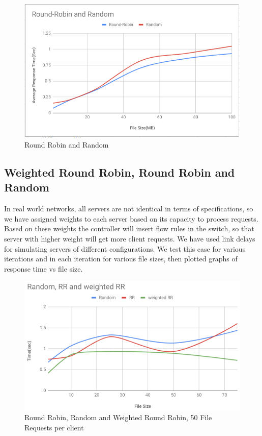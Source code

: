\documentclass[letterpaper, 10 pt, conference]{IEEEtran}
\begin{document}
\begin{figure}[ht!]
\centering
\includegraphics[width=\linewidth]{0.png}
\caption{Round Robin and Random\label{fig:5}}
\end{figure}

\subsection{Weighted Round Robin, Round Robin and Random}
In real world networks, all servers are not identical in terms of specifications, so we have assigned weights to each server based on its capacity to process requests. Based on these weights the controller will insert flow rules in the switch, so that server with higher weight will get more client requests. 
We have used link delays for simulating servers of different configurations. We test this case for various iterations and in each iteration for various file sizes, then plotted graphs of response time vs file size.

\begin{figure}[ht!]
\centering
\includegraphics[width=\linewidth]{1.png}
\caption{Round Robin, Random and Weighted Round Robin, 50 File Requests per client \label{fig:6}}
\end{figure}
\end{document}
